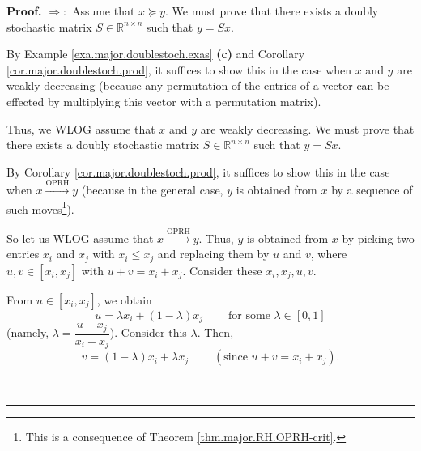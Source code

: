 \documentclass[numbers=enddot,12pt,final,onecolumn,notitlepage]{scrartcl}%
\numberwithin{exer}{subsection}
\theoremstyle{definition}
\newenvironment{proof}[1][Proof]{\noindent\textbf{#1.} }{\ \rule{0.5em}{0.5em}}
\begin{document}
\begin{proof}
$\Longrightarrow:$ Assume that $x\succcurlyeq y$. We must prove that there
exists a doubly stochastic matrix $S\in\mathbb{R}^{n\times n}$ such that
$y=Sx$.

By Example \ref{exa.major.doublestoch.exas} \textbf{(c)} and Corollary
\ref{cor.major.doublestoch.prod}, it suffices to show this in the case when
$x$ and $y$ are weakly decreasing (because any permutation of the entries of a
vector can be effected by multiplying this vector with a permutation matrix).

Thus, we WLOG assume that $x$ and $y$ are weakly decreasing. We must prove
that there exists a doubly stochastic matrix $S\in\mathbb{R}^{n\times n}$ such
that $y=Sx$.

By Corollary \ref{cor.major.doublestoch.prod}, it suffices to show this in the
case when $x\overset{\text{OPRH}}{\longrightarrow}y$ (because in the general
case, $y$ is obtained from $x$ by a sequence of such moves\footnote{This is a
consequence of Theorem \ref{thm.major.RH.OPRH-crit}.}).

So let us WLOG assume that $x\overset{\text{OPRH}}{\longrightarrow}y$. Thus,
$y$ is obtained from $x$ by picking two entries $x_{i}$ and $x_{j}$ with
$x_{i}\leq x_{j}$ and replacing them by $u$ and $v$, where $u,v\in\left[
x_{i},x_{j}\right]  $ with $u+v=x_{i}+x_{j}$. Consider these $x_{i},x_{j},u,v$.

From $u\in\left[  x_{i},x_{j}\right]  $, we obtain
\[
u=\lambda x_{i}+\left(  1-\lambda\right)  x_{j}\ \ \ \ \ \ \ \ \ \ \text{for
some }\lambda\in\left[  0,1\right]
\]
(namely, $\lambda=\dfrac{u-x_{j}}{x_{i}-x_{j}}$). Consider this $\lambda$.
Then,%
\[
v=\left(  1-\lambda\right)  x_{i}+\lambda x_{j}\ \ \ \ \ \ \ \ \ \ \left(
\text{since }u+v=x_{i}+x_{j}\right)  .
\]



\end{proof}
\end{document}
